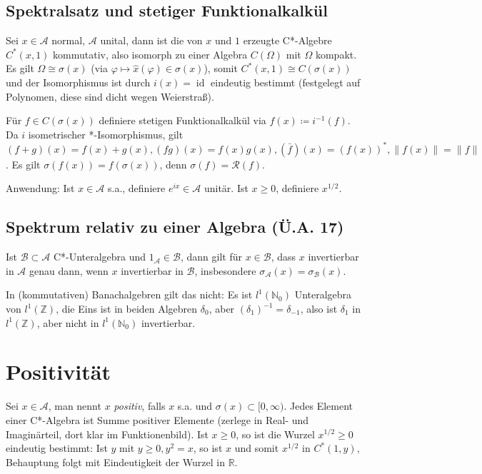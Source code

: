 \documentclass[11pt,a4paper]{scrartcl}
\newcommand{\N}{\mathbb{N}} %
\newcommand{\Z}{\mathbb{Z}} %
\newcommand{\R}{\mathbb{R}} %
\newcommand{\A}{\mathcal{A}}
\newcommand{\B}{\mathcal{B}}
\newcommand{\Rc}{\mathcal{R}}
\theoremstyle{plain}
\theoremstyle{definition}
\theoremstyle{remark}
\DeclareMathOperator{\id}{id}
\begin{document}
\subsection{Spektralsatz und stetiger Funktionalkalkül}

Sei $x\in \A$ normal, $\A$ unital, dann ist die von $x$ und $1$ erzeugte C*-Algebre $C^*(x,1)$ kommutativ, also isomorph zu einer Algebra $C(\Omega)$ mit $\Omega$ kompakt. Es gilt $\Omega \cong \sigma(x)$ (via $\varphi \mapsto \hat x(\varphi) \in \sigma(x)$), somit $C^*(x,1)\cong C(\sigma(x))$ und der Isomorphismus ist durch $i(x)=\id$ eindeutig bestimmt (festgelegt auf Polynomen, diese sind dicht wegen Weierstraß).

Für $f\in C(\sigma(x))$ definiere stetigen Funktionalkalkül via $f(x) \coloneqq i^{-1}(f)$. Da $i$ isometrischer *-Isomorphismus, gilt $(f+g)(x)=f(x)+g(x), (fg)(x)=f(x)g(x), (\bar f)(x)=(f(x))^*, \|f(x)\|=\|f\|$. Es gilt $\sigma(f(x))=f(\sigma(x))$, denn $\sigma(f)=\Rc(f)$.

Anwendung: Ist $x\in \A$ s.a., definiere $e^{ix}\in \A$ unitär. Ist $x \geq 0$, definiere $x^{1/2}$.

\subsection{Spektrum relativ zu einer Algebra (Ü.A. 17)}

Ist $\B \subset \A$ C*-Unteralgebra und $1_\mathcal{A} \in \B$, dann gilt für $x\in \B$, dass $x$ invertierbar in $\A$ genau dann, wenn $x$ invertierbar in $\B$, insbesondere $\sigma_\A(x)=\sigma_\B(x)$.

In (kommutativen) Banachalgebren gilt das nicht: Es ist $l^1(\N_0)$ Unteralgebra von $l^1(\Z)$, die Eins ist in beiden Algebren $\delta_0$, aber $(\delta_1)^{-1}=\delta_{-1}$, also ist $\delta_1$ in $l^1(\Z)$, aber nicht in $l^1(\N_0)$ invertierbar.

\section{Positivität}

Sei $x\in \A$, man nennt $x$ \emph{positiv}, falls $x$ s.a. und $\sigma(x) \subset [0,\infty)$. Jedes Element einer C*-Algebra ist Summe positiver Elemente (zerlege in Real- und Imaginärteil, dort klar im Funktionenbild). Ist $x \geq 0$, so ist die Wurzel $x^{1/2} \geq 0$ eindeutig bestimmt: Ist $y$ mit $y \geq 0, y^2=x$, so ist $x$ und somit $x^{1/2}$ in $C^*(1,y)$, Behauptung folgt mit Eindeutigkeit der Wurzel in $\R$.
\end{document}
